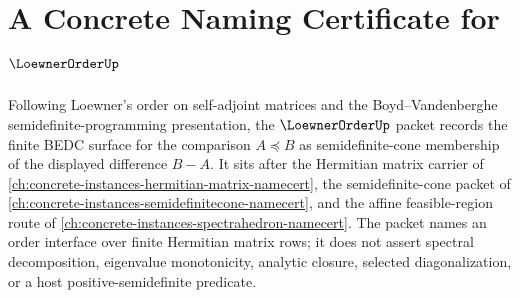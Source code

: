 \chapter{A Concrete Naming Certificate for $\LoewnerOrderUp$}
\label{ch:concrete-instances-loewner-order-namecert}

Following Loewner's order on self-adjoint matrices and the Boyd--Vandenberghe semidefinite-programming presentation, the $\LoewnerOrderUp$ packet records the finite BEDC surface for the comparison $A \preceq B$ as semidefinite-cone membership of the displayed difference $B-A$. It sits after the Hermitian matrix carrier of \autoref{ch:concrete-instances-hermitian-matrix-namecert}, the semidefinite-cone packet of \autoref{ch:concrete-instances-semidefinitecone-namecert}, and the affine feasible-region route of \autoref{ch:concrete-instances-spectrahedron-namecert}. The packet names an order interface over finite Hermitian matrix rows; it does not assert spectral decomposition, eigenvalue monotonicity, analytic closure, selected diagonalization, or a host positive-semidefinite predicate.

